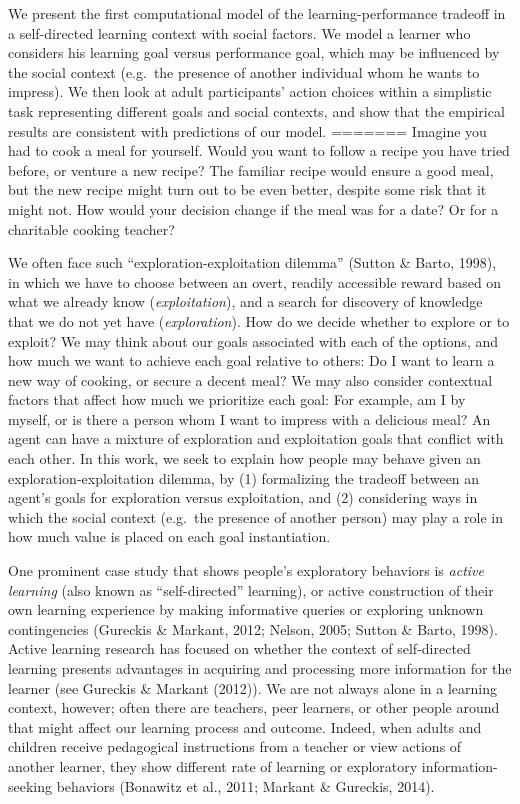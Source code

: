 \documentclass[10pt, letterpaper]{article}
\begin{document}
We present the first computational model of the learning-performance
tradeoff in a self-directed learning context with social factors. We
model a learner who considers his learning goal versus performance goal,
which may be influenced by the social context (e.g.~the presence of
another individual whom he wants to impress). We then look at adult
participants' action choices within a simplistic task representing
different goals and social contexts, and show that the empirical results
are consistent with predictions of our model.
=======
Imagine you had to cook a meal for yourself. Would you want to follow a
recipe you have tried before, or venture a new recipe? The familiar
recipe would ensure a good meal, but the new recipe might turn out to be
even better, despite some risk that it might not. How would your
decision change if the meal was for a date? Or for a charitable cooking
teacher?

We often face such ``exploration-exploitation dilemma'' (Sutton \&
Barto, 1998), in which we have to choose between an overt, readily
accessible reward based on what we already know (\emph{exploitation}),
and a search for discovery of knowledge that we do not yet have
(\emph{exploration}). How do we decide whether to explore or to exploit?
We may think about our goals associated with each of the options, and
how much we want to achieve each goal relative to others: Do I want to
learn a new way of cooking, or secure a decent meal? We may also
consider contextual factors that affect how much we prioritize each
goal: For example, am I by myself, or is there a person whom I want to
impress with a delicious meal? An agent can have a mixture of
exploration and exploitation goals that conflict with each other. In
this work, we seek to explain how people may behave given an
exploration-exploitation dilemma, by (1) formalizing the tradeoff
between an agent's goals for exploration versus exploitation, and (2)
considering ways in which the social context (e.g.~the presence of
another person) may play a role in how much value is placed on each goal
instantiation.

One prominent case study that shows people's exploratory behaviors is
\emph{active learning} (also known as ``self-directed'' learning), or
active construction of their own learning experience by making
informative queries or exploring unknown contingencies (Gureckis \&
Markant, 2012; Nelson, 2005; Sutton \& Barto, 1998). Active learning
research has focused on whether the context of self-directed learning
presents advantages in acquiring and processing more information for the
learner (see Gureckis \& Markant (2012)). We are not always alone in a
learning context, however; often there are teachers, peer learners, or
other people around that might affect our learning process and outcome.
Indeed, when adults and children receive pedagogical instructions from a
teacher or view actions of another learner, they show different rate of
learning or exploratory information-seeking behaviors (Bonawitz et al.,
2011; Markant \& Gureckis, 2014).
\end{document}
